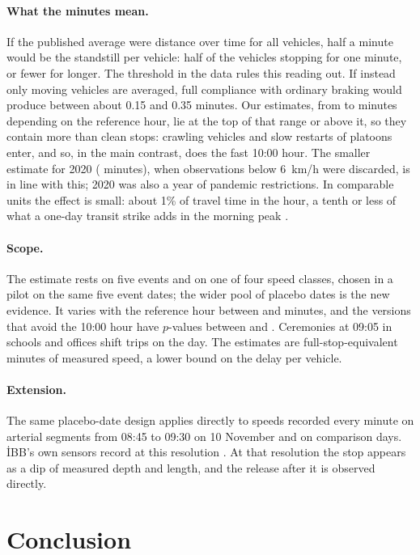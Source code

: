\documentclass[11pt,a4paper]{article}
\begin{document}
\paragraph{What the minutes mean.} If the published average were distance over time for all
vehicles, half a minute would be the standstill per vehicle: half of the vehicles stopping for one
minute, or fewer for longer. The threshold in the data rules this reading out. If instead only
moving vehicles are averaged, full compliance with ordinary braking would produce between about 0.15
and 0.35 minutes. Our estimates, from \minRobPre{} to \minRobPost{} minutes depending on the reference hour, lie at
the top of that range or above it, so they contain more than clean stops:
crawling vehicles and slow restarts of platoons enter, and so, in the main contrast, does the fast
10:00 hour. The smaller estimate for 2020 (\minFastTwenty{} minutes), when observations below
6~km/h were discarded, is in line with this; 2020 was also a year of pandemic restrictions. In comparable units the effect is small: about 1\% of travel time in the hour, a tenth or
less of what a one-day transit strike adds in the morning peak
\citep{bauernschuster2017,anderson2014}.

\paragraph{Scope.} The estimate rests on five events and on one of four speed classes, chosen in
a pilot on the same five event dates; the wider pool of placebo dates is the new evidence. It varies
with the reference hour between \minRobPre{} and \minRobPost{} minutes, and the versions that avoid
the 10:00 hour have $p$-values between \pRobFar{} and \pRobPre. Ceremonies at 09:05 in schools and
offices shift trips on the day. The estimates are full-stop-equivalent minutes of measured speed,
a lower bound on the delay per vehicle.

\paragraph{Extension.} The same placebo-date design applies directly to speeds recorded every
minute on arterial segments from 08:45 to 09:30 on 10 November and on comparison days. İBB's own
sensors record at this resolution \citep{takak2021}. At that resolution the stop appears as a dip
of measured depth and length, and the release after it is observed directly.

\section{Conclusion}
\end{document}

